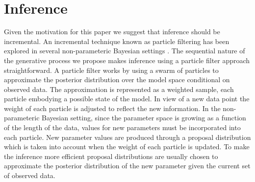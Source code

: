 \section{Inference}
\label{inference}


Given the motivation for this paper we suggest that inference should be incremental.  An incremental technique known as particle filtering has been explored in several non-parameteric Bayesian settings \cite{Fearnhead2004, others}.  The sequential nature of the generative process we propose makes inference using a particle filter approach straightforward. A particle filter works by using a swarm of particles to approximate the posterior distribution over the model space conditional on observed data.  The approximation is represented as a weighted sample, each particle embodying a possible state of the model.  In view of a new data point the weight of each particle is adjusted to reflect the new information.  In the non-parameteric Bayesian setting, since the parameter space is growing as a function of the length of the data, values for new parameters must be incorporated into each particle.  New parameter values are produced through a proposal distribution which is taken into account when the weight of each particle is updated.  To make the inference more efficient proposal distributions are usually chosen to approximate the posterior distribution of the new parameter given the current set of observed data.

